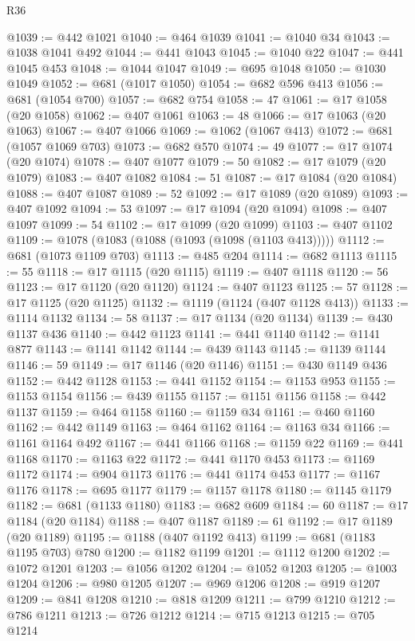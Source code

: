 \begin{lexlean}{R36}
\begin{coremodule}
@1039 := @442 @1021
@1040 := @464 @1039
@1041 := @1040 @34
@1043 := @1038 @1041 @492
@1044 := @441 @1043
@1045 := @1040 @22
@1047 := @441 @1045 @453
@1048 := @1044 @1047
@1049 := @695 @1048
@1050 := @1030 @1049
@1052 := @681 (@1017 @1050)
@1054 := @682 @596 @413
@1056 := @681 (@1054 @700)
@1057 := @682 @754
@1058 := 47
@1061 := @17 @1058 (@20 @1058)
@1062 := @407 @1061
@1063 := 48
@1066 := @17 @1063 (@20 @1063)
@1067 := @407 @1066
@1069 := @1062 (@1067 @413)
@1072 := @681 (@1057 @1069 @703)
@1073 := @682 @570
@1074 := 49
@1077 := @17 @1074 (@20 @1074)
@1078 := @407 @1077
@1079 := 50
@1082 := @17 @1079 (@20 @1079)
@1083 := @407 @1082
@1084 := 51
@1087 := @17 @1084 (@20 @1084)
@1088 := @407 @1087
@1089 := 52
@1092 := @17 @1089 (@20 @1089)
@1093 := @407 @1092
@1094 := 53
@1097 := @17 @1094 (@20 @1094)
@1098 := @407 @1097
@1099 := 54
@1102 := @17 @1099 (@20 @1099)
@1103 := @407 @1102
@1109 := @1078 (@1083 (@1088 (@1093 (@1098 (@1103 @413)))))
@1112 := @681 (@1073 @1109 @703)
@1113 := @485 @204
@1114 := @682 @1113
@1115 := 55
@1118 := @17 @1115 (@20 @1115)
@1119 := @407 @1118
@1120 := 56
@1123 := @17 @1120 (@20 @1120)
@1124 := @407 @1123
@1125 := 57
@1128 := @17 @1125 (@20 @1125)
@1132 := @1119 (@1124 (@407 @1128 @413))
@1133 := @1114 @1132
@1134 := 58
@1137 := @17 @1134 (@20 @1134)
@1139 := @430 @1137 @436
@1140 := @442 @1123
@1141 := @441 @1140
@1142 := @1141 @877
@1143 := @1141 @1142
@1144 := @439 @1143
@1145 := @1139 @1144
@1146 := 59
@1149 := @17 @1146 (@20 @1146)
@1151 := @430 @1149 @436
@1152 := @442 @1128
@1153 := @441 @1152
@1154 := @1153 @953
@1155 := @1153 @1154
@1156 := @439 @1155
@1157 := @1151 @1156
@1158 := @442 @1137
@1159 := @464 @1158
@1160 := @1159 @34
@1161 := @460 @1160
@1162 := @442 @1149
@1163 := @464 @1162
@1164 := @1163 @34
@1166 := @1161 @1164 @492
@1167 := @441 @1166
@1168 := @1159 @22
@1169 := @441 @1168
@1170 := @1163 @22
@1172 := @441 @1170 @453
@1173 := @1169 @1172
@1174 := @904 @1173
@1176 := @441 @1174 @453
@1177 := @1167 @1176
@1178 := @695 @1177
@1179 := @1157 @1178
@1180 := @1145 @1179
@1182 := @681 (@1133 @1180)
@1183 := @682 @609
@1184 := 60
@1187 := @17 @1184 (@20 @1184)
@1188 := @407 @1187
@1189 := 61
@1192 := @17 @1189 (@20 @1189)
@1195 := @1188 (@407 @1192 @413)
@1199 := @681 (@1183 @1195 @703) @780
@1200 := @1182 @1199
@1201 := @1112 @1200
@1202 := @1072 @1201
@1203 := @1056 @1202
@1204 := @1052 @1203
@1205 := @1003 @1204
@1206 := @980 @1205
@1207 := @969 @1206
@1208 := @919 @1207
@1209 := @841 @1208
@1210 := @818 @1209
@1211 := @799 @1210
@1212 := @786 @1211
@1213 := @726 @1212
@1214 := @715 @1213
@1215 := @705 @1214

\end{coremodule}
\end{lexlean}
